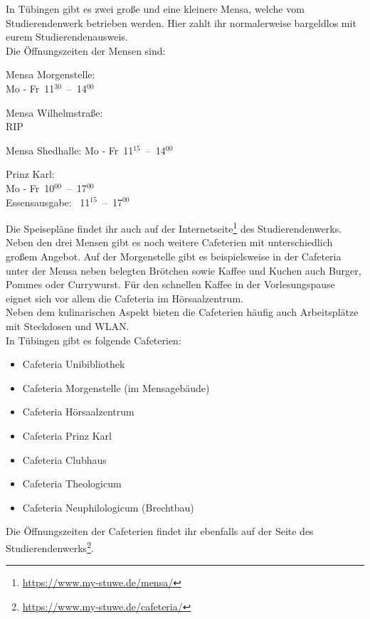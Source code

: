 In Tübingen gibt es zwei große und eine kleinere Mensa, welche vom Studierendenwerk betrieben werden. Hier zahlt ihr normalerweise bargeldlos mit eurem Studierendenausweis.\\
Die Öffnungszeiten der Mensen sind:
\begin{center}

Mensa Morgenstelle:\\
Mo - Fr~11$^{\underline{30}}$~--~14$^{\underline{00}}$

\bigskip

Mensa Wilhelmstraße:\\
RIP\\

\bigskip

Mensa Shedhalle:
Mo - Fr~11$^{\underline{15}}$~--~14$^{\underline{00}}$

\nopagebreak
Prinz Karl:\\
Mo - Fr~10$^{\underline{00}}$~--~17$^{\underline{00}}$\\
Essensausgabe: ~11$^{\underline{15}}$~--~17$^{\underline{00}}$

\end{center}

Die Speisepläne findet ihr auch auf der Internetseite\footnote{\url{https://www.my-stuwe.de/mensa/}} des Studierendenwerks.\\

Neben den drei Mensen gibt es noch weitere Cafeterien mit unterschiedlich großem Angebot. Auf der Morgenstelle gibt es beispielsweise in der Cafeteria unter der Mensa neben belegten Brötchen sowie Kaffee und Kuchen auch Burger, Pommes oder Currywurst. Für den schnellen Kaffee in der Vorlesungspause eignet sich vor allem die Cafeteria im Hörsaalzentrum.\\
Neben dem kulinarischen Aspekt bieten die Cafeterien häufig auch Arbeitsplätze mit Steckdosen und WLAN.\\
In Tübingen gibt es folgende Cafeterien:
\begin{itemize}
	\item Cafeteria Unibibliothek
	\item Cafeteria Morgenstelle (im Mensagebäude)
	\item Cafeteria Hörsaalzentrum
	\item Cafeteria Prinz Karl
	\item Cafeteria Clubhaus
	\item Cafeteria Theologicum
	\item Cafeteria Neuphilologicum (Brechtbau)
\end{itemize}
Die Öffnungszeiten der Cafeterien findet ihr ebenfalls auf der Seite des Studierendenwerks\footnote{\url{https://www.my-stuwe.de/cafeteria/}}.
